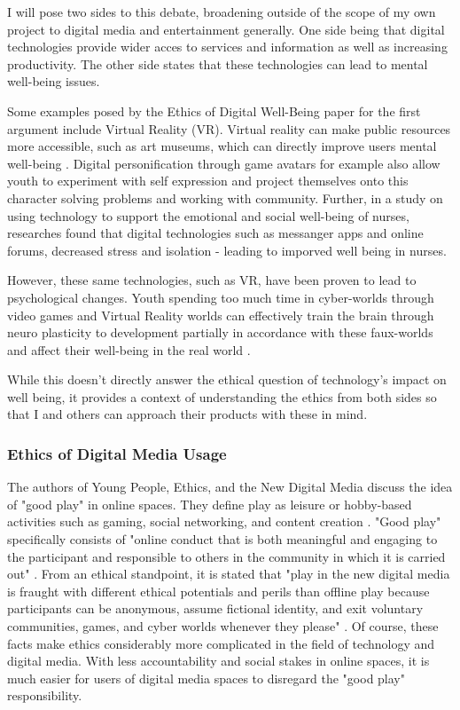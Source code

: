 \documentclass[10pt,twocolumn]{article}
\begin{document}
I will pose two sides to this debate, broadening outside of the scope of my own project to digital media and entertainment generally. One side being that digital technologies provide wider acces to services and information as well as increasing productivity. The other side states that these technologies can lead to mental well-being issues. 

Some examples posed by the Ethics of Digital Well-Being paper for the first argument include Virtual Reality (VR). Virtual reality can make public resources more accessible, such as art museums, which can directly improve users mental well-being \cite{nihEthicsDigital}. Digital personification through game avatars for example also allow youth to experiment with self expression and project themselves onto this character solving problems and working with community. Further, in a study on using technology to support the emotional and social well-being of nurses, researches found that digital technologies such as messanger apps and online forums, decreased stress and isolation - leading to imporved well being in nurses\cite{UsingTechnologyNurses}. 

However, these same technologies, such as VR, have been proven to lead to psychological changes. Youth spending too much time in cyber-worlds through video games and Virtual Reality worlds can effectively train the brain through neuro plasticity to development partially in accordance with these faux-worlds and affect their well-being in the real world \cite{nihEthicsDigital}.

While this doesn't directly answer the ethical question of technology's impact on well being, it provides a context of understanding the ethics from both sides so that I and others can approach their products with these in mind. 


\subsubsection{Ethics of Digital Media Usage}
The authors of Young People, Ethics, and the New Digital Media discuss the idea of "good play" in online spaces. They define play as leisure or hobby-based activities such as gaming, social networking, and content creation \cite{mitYoungPeople}. "Good play" specifically consists of "online conduct that is both meaningful and engaging to the participant and responsible to others in the community in which it is carried out" \cite{mitYoungPeople}. From an ethical standpoint, it is stated that "play in the new digital media is fraught with different ethical potentials and perils than offline play because participants can be anonymous, assume fictional identity, and exit voluntary communities, games, and cyber worlds whenever they please" \cite{mitYoungPeople}. Of course, these facts make ethics considerably more complicated in the field of technology and digital media. With less accountability and social stakes in online spaces, it is much easier for users of digital media spaces to disregard the "good play" responsibility.  
\end{document}

